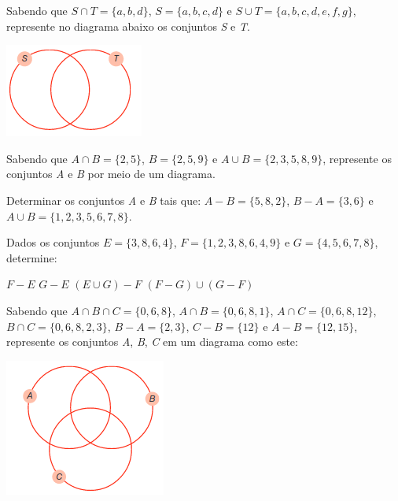 \documentclass[10pt,a4paper]{article}
\begin{document}
\begin{multicols}{2}
    \begin{question}[type=exam]
      Sabendo que $S \cap T = \big\{a,b,d\big\}$, $S = \big\{a,b,c,d\big\}$ e $S \cup T = \big\{a,b,c,d,e,f,g\big\}$, represente no diagrama abaixo os conjuntos \textit{S} e \textit{T}.
      \begin{Figure}
        \centering
        \includegraphics[scale=1]{figures/q6.png}
      \end{Figure}
    \end{question}

    \begin{question}[type=exam]
      Sabendo que $A \cap B = \big\{2,5\big\}$, $B = \big\{2,5,9\big\}$ e $A \cup B = \big\{2,3,5,8,9\big\}$, represente os conjuntos \textit{A} e \textit{B} por meio de um diagrama.
    \end{question}

    \begin{question}[type=exam]
      Determinar os conjuntos \textit{A} e \textit{B} tais que: $A - B = \big\{5,8,2\big\}$, $B - A = \big\{3,6\big\}$ e $A \cup B = \big\{1,2,3,5,6,7,8\big\}$.
    \end{question}

    \begin{question}[type=exam]
      Dados os conjuntos $E = \big\{3,8,6,4\big\}$, $F = \big\{1,2,3,8,6,4,9\big\}$ e $G = \big\{4,5,6,7,8\big\}$, determine:
      \begin{tasks}
        \task $F - E$
        \task $G - E$
        \task $(E \cup G) - F$
        \task $(F - G) \cup (G - F)$
      \end{tasks}
    \end{question}

    \begin{question}[type=exam]
      Sabendo que $A \cap B \cap C = \big\{0,6,8\big\}$, $A \cap B = \big\{0,6,8,1\big\}$, $A \cap C = \big\{0,6,8,12\big\}$, $B \cap C = \big\{0,6,8,2,3\big\}$, $B - A = \big\{2,3\big\}$,
      $C - B = \big\{12\big\}$ e $A - B = \big\{12,15\big\}$, represente os conjuntos \textit{A}, \textit{B}, \textit{C} em um diagrama como este:
      \begin{Figure}
        \centering
        \includegraphics[scale=1]{figures/q10.png}
      \end{Figure}
    \end{question}


\end{multicols}
\end{document}
